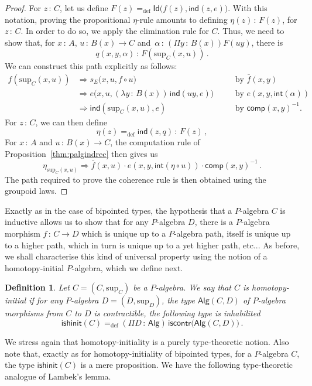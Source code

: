 \documentclass[10pt,a4paper,oneside,reqno]{amsart}
\theoremstyle{mythm}
\theoremstyle{mydef}
\newtheorem{definition}[theorem]{Definition}
\theoremstyle{myrmk}
\newcommand{\ie}{\text{i.e.\ }}
\newcommand{\by}[1]{\quad&&\text{by {$#1$}}}
\newcommand{\defeq}{=_{\mathrm{def}}}
\newcommand{\co}{\,{:}\,}
\newcommand{\iscontr}{\mathsf{iscontr}}
\newcommand{\isalghinit}{\mathsf{ishinit}}
\renewcommand{\int}{\mathsf{int}}
\newcommand{\Id}{\mathsf{Id}}
\newcommand{\ind}{\mathsf{ind}}
\newcommand{\comp}{\mathsf{comp}}
\newcommand{\Palg}{\mathsf{Alg}}
\renewcommand{\sup}{\mathrm{sup}}
\begin{document}
\begin{proof} For $z \co C$, let us define $F(z) \defeq \Id \big(   f(z), \ind(z,e))$. With this notation, proving
 the propositional $\eta$-rule amounts to defining $\eta(z) \co F(z)$, for $z \co C$. In order to do so, we apply
the elimination rule for $C$. Thus, we need to show that, for $x \co A$, $u \co B(x) \to C$ and~$\alpha \co 
(\Pi y \co B(x)) F(uy)$, there 
is 
\[
q(x,y,\alpha) \co   F(\sup_C(x,u)) \, .
\]
We can construct this path explicitly as follows:
\begin{align*}
f(\sup_C(x,u)) &\Rightarrow s_E\big(x,u , f \circ u \big)   \by{\bar{f}(x,y)}\\
	&\Rightarrow e\big(x,u, (\lambda y \co B(x) )\, \ind(u y ,e) \big) \by{e(x,y,\int(\alpha))}\\
	& \Rightarrow \ind(\sup_C(x,u),e) \by{\comp(x,y)^{-1}}.
\end{align*}
For $z \co C$, we can then define
\[
\eta(z) \defeq \ind(z,q) \co F(z) \, ,
\] 
For $x \co A$ and $u \co B(x) \to C$, the  computation rule of Proposition~\ref{thm:palgindrec} then gives us
\[
 \eta_{\sup_C(x,u)} \Rightarrow  \bar{f}(x,u) \cdot e(x,y,\int(  \eta \circ u ))  \cdot  \comp(x,y)^{-1} \, .
\]
The path required to prove  the coherence rule is then obtained using the groupoid laws.
\end{proof}

Exactly as in the case of bipointed types, the hypothesis that a $P$-algebra $C$ is inductive allows us to show that for any
$P$-algebra $D$, there is a $P$-algebra morphism $f \co C \to D$ which is unique up to a $P$-algebra path, itself is unique up 
to a higher path, which in turn is unique up to a yet higher path, etc... As before, we shall characterise this kind of universal property
using the notion of a homotopy-initial $P$-algebra, which we define next.

\begin{definition}\label{def:AlgInit}
Let $C = (C, \sup_C)$ be a $P$-algebra. We say that $C$ is  \emph{homotopy-initial}  if for any $P$-algebra 
$D = (D, \sup_D)$, the type $\Palg(C,D)$ of $P$-algebra morphisms from $C$ to $D$
is contractible, \ie the following type is inhabilited
\[
\isalghinit(C) \defeq
 (\Pi D \co \Palg)  \, \iscontr \big( \Palg(C,D) \big)  \, .
\]  
\end{definition}

We stress again that homotopy-initiality is a purely type-theoretic notion. Also note that, exactly as for 
homotopy-initiality of bipointed types, for a $P$-algebra $C$, the type
$\isalghinit(C)$ is a mere proposition. 
We have the following type-theoretic analogue of Lambek's lemma.
\end{document}
